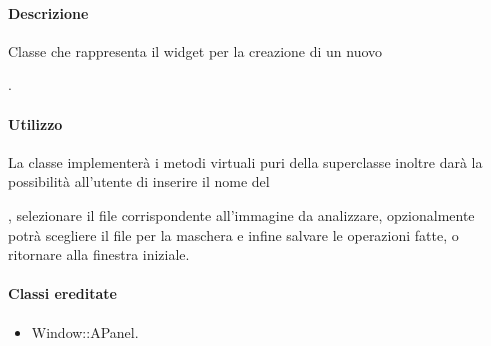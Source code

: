 \paragraph{Descrizione \\}
Classe che rappresenta il widget per la creazione di un nuovo \subject{}.
\paragraph{Utilizzo\\}
La classe implementerà i metodi virtuali puri della superclasse inoltre darà la possibilità all'utente di inserire il nome del \subject{}, selezionare il file corrispondente all'immagine da analizzare, opzionalmente potrà scegliere il file per la maschera e infine salvare le operazioni fatte, o ritornare alla finestra iniziale.
\paragraph{Classi ereditate\\}
\begin{itemize}
\item Window::APanel.
\end{itemize}
